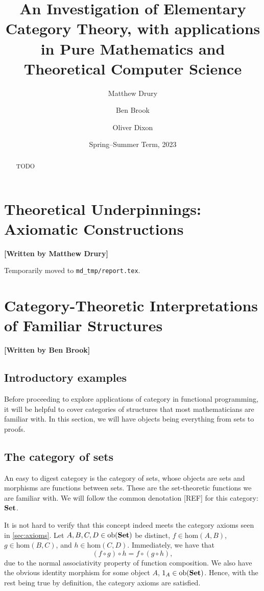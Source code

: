 \documentclass[10pt,a4paper,reqno]{amsart}
\title[An Investigation of Elementary Category Theory]{An Investigation of %
        Elementary Category Theory, with applications in Pure Mathematics and %
        Theoretical Computer Science}
\author{Matthew Drury} \email{\yorkemail{md1499}}
\author{Ben Brook}     \email{\yorkemail{bb1170}}
\author{Oliver Dixon}  \email{\yorkemail{od641}}
\date{Spring--Summer Term, 2023}
\numberwithin{figure}{section}
\begin{document}
\begin{abstract}
        TODO
\end{abstract}
\maketitle
\tableofcontents
\section{Theoretical %
        Underpinnings: Axiomatic Constructions}
\begin{flushright}
        \textbf{[Written by Matthew Drury]}
\end{flushright}

\noindent Temporarily moved to \texttt{md\_tmp/report.tex}.

\section{Category-Theoretic %
        Interpretations of Familiar Structures}
\begin{flushright}
        \textbf{[Written by Ben Brook]}
\end{flushright}

\subsection{Introductory examples}
Before proceeding to explore applications of category in functional programming,
it will be helpful to cover categories of structures that most mathematicians
are familiar with. In this section, we will have objects being everything from
sets to proofs.

\subsection{The category of sets}
An easy to digest category is the category of sets, whose objects are sets and
morphisms are functions between sets. These are the set-theoretic functions we
are familiar with. We will follow the common denotation [REF] for this category:
$\operatorname{\mathbf{Set}}$.

It is not hard to verify that this concept indeed meets the category axioms seen
in \autoref{sec:axioms}. Let $A,B,C,D \in \mathrm{ob} ( \operatorname{\mathbf{Set}} )$ be distinct,
$f \in \mathrm{hom} (A, B)$, $g \in \mathrm{hom} (B, C)$, and $h \in
\mathrm{hom} (C, D)$. Immediately, we have that
\begin{equation*}
        ( f \circ g ) \circ h = f \circ ( g \circ h ),
\end{equation*}
due to the normal associativity property of function composition. We also have
the obvious identity morphism for some object $A$, $1_A \in \mathrm{ob}
( \operatorname{\mathbf{Set}} )$. Hence, with the rest being true by definition, the category axioms
are satisfied.
\end{document}
